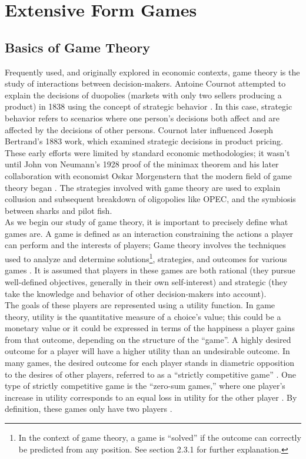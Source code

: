 \chapter{Extensive Form Games}
\section{Basics of Game Theory}
Frequently used, and originally explored in economic contexts, game theory is the study of interactions between decision-makers. Antoine Cournot attempted to explain the decisions of duopolies (markets with only two sellers producing a product) in 1838 using the concept of strategic behavior \cite{webs14}. In this case, strategic behavior refers to scenarios where one person's decisions both affect and are affected by the decisions of other persons. Cournot later influenced Joseph Bertrand's 1883 work, which examined strategic decisions in product pricing. These early efforts were limited by standard economic methodologies; it wasn't until John von Neumann's 1928 proof of the minimax theorem and his later collaboration with economist Oskar Morgenstern that the modern field of game theory began \cite{webs14}. The strategies involved with game theory are used to explain collusion and subsequent breakdown of oligopolies like OPEC, and the symbiosis between sharks and pilot fish.\\

As we begin our study of game theory, it is important to precisely define what games are. A game is defined as an interaction constraining the actions a player can perform and the interests of players; Game theory involves the techniques used to analyze and determine solutions\footnote{In the context of game theory, a game is ``solved'' if the outcome can correctly be predicted from any position. See section 2.3.1 for further explanation.}, strategies, and outcomes for various games \cite{osbo94}. It is assumed that players in these games are both rational (they pursue well-defined objectives, generally in their own self-interest) and strategic (they take the knowledge and behavior of other decision-makers into account)\cite{osbo94}.\\

The goals of these players are represented using a utility function. In game theory, utility is the quantitative measure of a choice's value; this could be a monetary value or it could be expressed in terms of the happiness a player gains from that outcome, depending on the structure of the ``game''. A highly desired outcome for a player will have a higher utility than an undesirable outcome. In many games, the desired outcome for each player stands in diametric opposition to the desires of other players, referred to as a ``strictly competitive game'' \cite{osbo94}. One type of strictly competitive game is the ``zero-sum games,'' where one player's increase in utility corresponds to an equal loss in utility for the other player \cite{shoh09}. By definition, these games only have two players \cite{shoh09}.

